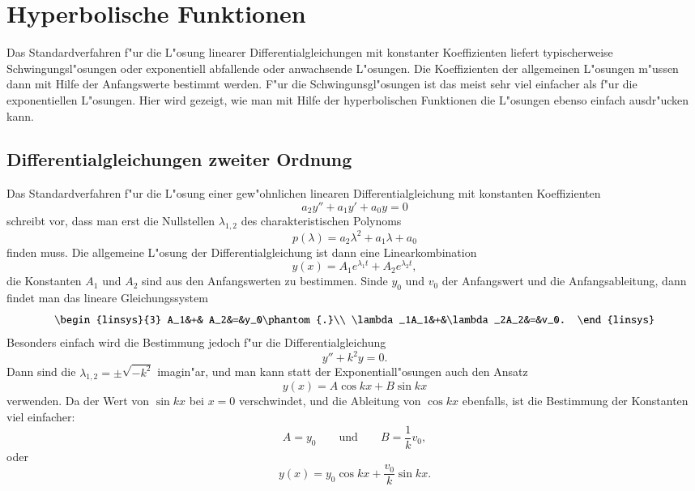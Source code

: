 %
%
%
\chapter{Hyperbolische Funktionen%
\label{skript:chapter:hyperbolisch}}
\rhead{}
Das Standardverfahren f"ur die L"osung linearer Differentialgleichungen
mit konstanter Koeffizienten liefert typischerweise Schwingungsl"osungen
oder exponentiell abfallende oder anwachsende L"osungen. Die Koeffizienten
der allgemeinen L"osungen m"ussen dann mit Hilfe der Anfangswerte bestimmt
werden. F"ur die Schwingunsgl"osungen ist das meist sehr viel einfacher
als f"ur die exponentiellen L"osungen. Hier wird gezeigt, wie man mit
Hilfe der hyperbolischen Funktionen die L"osungen ebenso einfach ausdr"ucken
kann.

\section{Differentialgleichungen zweiter Ordnung}
Das Standardverfahren f"ur die L"osung einer gew"ohnlichen linearen
Differentialgleichung mit konstanten Koeffizienten
\[
a_2y''+ a_1y'+a_0y=0
\]
schreibt vor, dass man erst die Nullstellen $\lambda_{1,2}$
des charakteristischen Polynoms
\[
p(\lambda)=a_2\lambda^2+a_1\lambda+a_0
\]
finden muss.
Die allgemeine L"osung der Differentialgleichung ist dann
eine Linearkombination
\[
y(x)=
A_1 e^{\lambda_1t}
+
A_2 e^{\lambda_2t},
\]
die Konstanten $A_1$ und $A_2$ sind aus den Anfangswerten zu bestimmen.
Sinde $y_0$ und $v_0$ der Anfangswert und die Anfangsableitung, dann
findet man das lineare Gleichungssystem
\[
\begin{linsys}{3}
         A_1&+&         A_2&=&y_0\phantom{.}\\
\lambda_1A_1&+&\lambda_2A_2&=&v_0.
\end{linsys}
\]
Besonders einfach wird die Bestimmung jedoch f"ur die Differentialgleichung
\[
y''+k^2 y=0.
\]
Dann sind die $\lambda_{1,2}=\pm\sqrt{-k^2}$ imagin"ar, und man kann statt
der Exponentiall"osungen auch den Ansatz
\[
y(x)=A\cos kx+B\sin kx
\]
verwenden.
Da der Wert von $\sin kx$ bei $x=0$ verschwindet, und die Ableitung von
$\cos kx$ ebenfalls, ist die Bestimmung der Konstanten viel einfacher:
\[
A=y_0
\qquad\text{und}\qquad
B=\frac1kv_0,
\]
oder
\begin{equation}
y(x)=y_0\cos kx + \frac{v_0}{k}\sin kx.
\label{hyp:loesung}
\end{equation}

